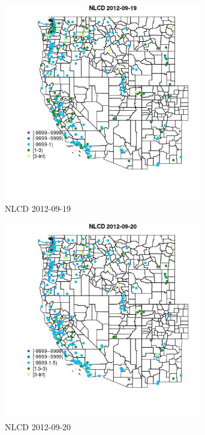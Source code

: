 \begin{figure} 
\centering  
\includegraphics[width=0.77\textwidth]{Code_Outputs/ML_input_report_ML_input_PM25_Step5_part_d_de_duplicated_aves_ML_input_MapObsNLCD2012-09-19.jpg} 
\caption{\label{fig:ML_input_report_ML_input_PM25_Step5_part_d_de_duplicated_aves_ML_inputMapObsNLCD2012-09-19}NLCD 2012-09-19} 
\end{figure} 
 

\begin{figure} 
\centering  
\includegraphics[width=0.77\textwidth]{Code_Outputs/ML_input_report_ML_input_PM25_Step5_part_d_de_duplicated_aves_ML_input_MapObsNLCD2012-09-20.jpg} 
\caption{\label{fig:ML_input_report_ML_input_PM25_Step5_part_d_de_duplicated_aves_ML_inputMapObsNLCD2012-09-20}NLCD 2012-09-20} 
\end{figure} 
 

